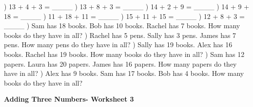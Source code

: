 \documentclass{article}%
\begin{document}
) 13 + 4 + 3 = \_\_\_\_%
\newline%
\newline%
) 13 + 8 + 3 = \_\_\_\_%
\newline%
\newline%
) 14 + 2 + 9 = \_\_\_\_%
\newline%
\newline%
) 14 + 9 + 18 = \_\_\_\_%
\newline%
\newline%
) 11 + 18 + 11 = \_\_\_\_%
\newline%
\newline%
) 15 + 11 + 15 = \_\_\_\_%
\newline%
\newline%
) 12 + 8 + 3 = \_\_\_\_%
\newline%
\newline%
) Sam has 18 books. Bob has 10 books. Rachel has 7 books. How many books do they have in all?%
\newline%
\newline%
) Rachel has 5 pens. Sally has 3 pens. James has 7 pens. How many pens do they have in all?%
\newline%
\newline%
) Sally has 19 books. Alex has 16 books. Rachel has 19 books. How many books do they have in all?%
\newline%
\newline%
) Sam has 12 papers. Laura has 20 papers. James has 16 papers. How many papers do they have in all?%
\newline%
\newline%
) Alex has 9 books. Sam has 17 books. Bob has 4 books. How many books do they have in all?%
\newline%
\newline%
\newline%
\pagebreak%
\large%
\begin{center}%
\textbf{Adding Three Numbers- Worksheet 3}%
\newline%
\end{center} \normalsize%
\end{document}
